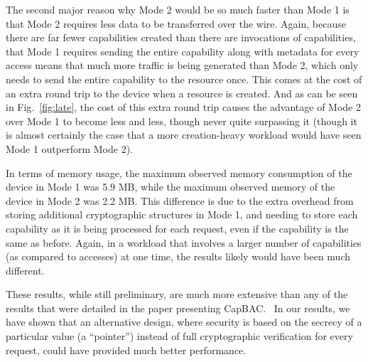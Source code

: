 The second major reason why Mode 2 would be so much faster than Mode 1 is that Mode 2 requires less data to be transferred over the wire. Again, because there are far fewer capabilities created than there are invocations of capabilities, that Mode 1 requires sending the entire capability along with metadata for every access means that much more traffic is being generated than Mode 2, which only needs to send the entire capability to the resource once. This comes at the cost of an extra round trip to the device when a resource is created. And as can be seen in Fig.~\ref{fig:late}, the cost of this extra round trip causes the advantage of Mode 2 over Mode 1 to become less and less, though never quite surpassing it (though it is almost certainly the case that a more creation-heavy workload would have seen Mode 1 outperform Mode 2).

In terms of memory usage, the maximum observed memory consumption of the device in Mode 1 was 5.9 MB, while the maximum observed memory of the device in Mode 2 was 2.2 MB. This difference is due to the extra overhead from storing additional cryptographic structures in Mode 1, and needing to store each capability as it is being processed for each request, even if the capability is the same as before. Again, in a workload that involves a larger number of capabilities (as compared to accesses) at one time, the results likely would have been much different.

These results, while still preliminary, are much more extensive than any of the results that were detailed in the paper presenting CapBAC.~\cite{hernandez2013distributed} In our results, we have shown that an alternative design, where security is based on the secrecy of a particular value (a ``pointer'') instead of full cryptographic verification for every request, could have provided much better performance.
